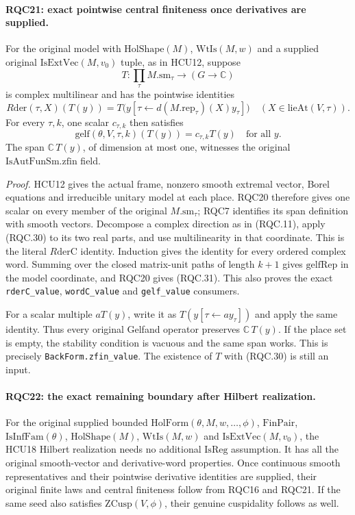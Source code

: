 \documentclass[11pt,a4paper]{article}
\numberwithin{equation}{section}
\theoremstyle{remark}\newtheorem{remark}[theorem]{Remark}
\begin{document}
\paragraph{RQC21: exact pointwise central finiteness once derivatives are supplied.}
\label{claim:RQC21}
For the original model with \(\mathrm{HolShape}(M)\),
\(\mathrm{WtIs}(M,w)\) and a supplied original
\(\mathrm{IsExtVec}(M,v_0)\) tuple, as in HCU12, suppose
\[
 T:\prod_\tau M.\mathrm{sm}_\tau\longrightarrow(G\to\mathbb C)
\]
is complex multilinear and has the pointwise identities
\[
 R\mathrm{der}(\tau,X)(T(y))
  =T\bigl(y[\tau\leftarrow d(M.\mathrm{rep}_\tau)(X)y_\tau]\bigr)
 \quad(X\in\mathrm{lieAt}(V,\tau)).
 \tag{RQC.30}
\]
For every \(\tau,k\), one scalar \(c_{\tau,k}\) then satisfies
\[
 \mathrm{gelf}(\theta,V,\tau,k)(T(y))=c_{\tau,k}T(y)
 \quad\text{for all }y.
 \tag{RQC.31}
\]
The span \(\mathbb C\,T(y)\), of dimension at most one, witnesses
the original \(\mathrm{IsAutFunSm.zfin}\) field.

\emph{Proof.}
HCU12 gives the actual frame, nonzero smooth extremal vector,
Borel equations and irreducible unitary model at each place.
RQC20 therefore gives one scalar on every member of the original
\(M.\mathrm{sm}_\tau\); RQC7 identifies its span definition with
smooth vectors.
Decompose a complex direction as in (RQC.11), apply (RQC.30)
to its two real parts, and use multilinearity in that coordinate.
This is the literal \(R\mathrm{derC}\) identity.
Induction gives the identity for every ordered complex word.
Summing over the closed matrix-unit paths of length \(k+1\)
gives \(\mathrm{gelfRep}\) in the model coordinate, and RQC20
gives (RQC.31).  This also proves the exact
\texttt{rderC\_value}, \texttt{wordC\_value} and
\texttt{gelf\_value} consumers.

For a scalar multiple \(aT(y)\), write it as
\(T(y[\tau\leftarrow ay_\tau])\) and apply the same identity.
Thus every original Gelfand operator preserves \(\mathbb C\,T(y)\).
If the place set is empty, the stability condition is vacuous
and the same span works.
This is precisely \texttt{BackForm.zfin\_value}.
The existence of \(T\) with (RQC.30) is still an input.

\paragraph{RQC22: the exact remaining boundary after Hilbert realization.}
\label{claim:RQC22}
For the original supplied bounded \(\mathrm{HolForm}(\theta,M,w,\ldots,\phi)\),
\(\mathrm{FinPair}\), \(\mathrm{IsInfFam}(\theta)\),
\(\mathrm{HolShape}(M)\), \(\mathrm{WtIs}(M,w)\) and
\(\mathrm{IsExtVec}(M,v_0)\),
the HCU18 Hilbert realization needs no additional
\(\mathrm{IsReg}\) assumption.
It has all the original smooth-vector and derivative-word
properties.  Once continuous smooth representatives and their
pointwise derivative identities are supplied, their original
finite laws and central finiteness follow from RQC16 and RQC21.
If the same seed also satisfies \(\mathrm{ZCusp}(V,\phi)\),
their genuine cuspidality follows as well.
\end{document}
